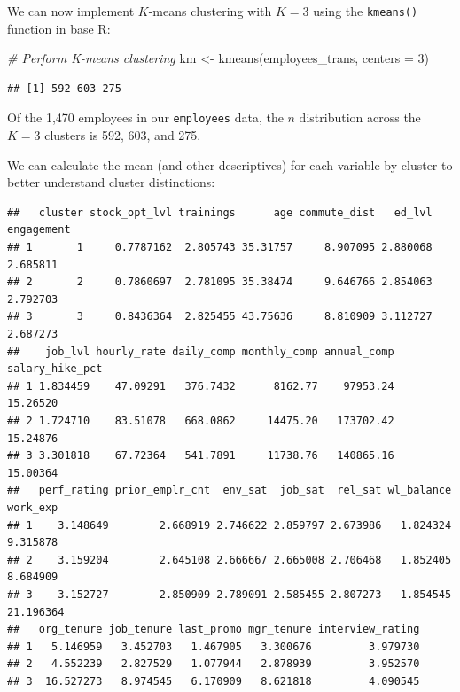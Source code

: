 \documentclass[
]{book}
\newenvironment{Shaded}{\begin{snugshade}}{\end{snugshade}}
\newcommand{\AttributeTok}[1]{\textcolor[rgb]{0.77,0.63,0.00}{#1}}
\newcommand{\CommentTok}[1]{\textcolor[rgb]{0.56,0.35,0.01}{\textit{#1}}}
\newcommand{\DecValTok}[1]{\textcolor[rgb]{0.00,0.00,0.81}{#1}}
\newcommand{\FunctionTok}[1]{\textcolor[rgb]{0.00,0.00,0.00}{#1}}
\newcommand{\NormalTok}[1]{#1}
\newcommand{\OtherTok}[1]{\textcolor[rgb]{0.56,0.35,0.01}{#1}}
\newcommand{\SpecialCharTok}[1]{\textcolor[rgb]{0.00,0.00,0.00}{#1}}
\begin{document}
We can now implement \(K\)-means clustering with \(K = 3\) using the \texttt{kmeans()} function in base R:

\begin{Shaded}
\begin{Highlighting}[]
\CommentTok{\# Perform K{-}means clustering}
\NormalTok{km }\OtherTok{\textless{}{-}} \FunctionTok{kmeans}\NormalTok{(employees\_trans, }\AttributeTok{centers =} \DecValTok{3}\NormalTok{)}
\end{Highlighting}
\end{Shaded}

\begin{Shaded}
\end{Shaded}

\begin{verbatim}
## [1] 592 603 275
\end{verbatim}

Of the 1,470 employees in our \texttt{employees} data, the \(n\) distribution across the \(K = 3\) clusters is 592, 603, and 275.

We can calculate the mean (and other descriptives) for each variable by cluster to better understand cluster distinctions:

\begin{Shaded}
\end{Shaded}

\begin{verbatim}
##   cluster stock_opt_lvl trainings      age commute_dist   ed_lvl engagement
## 1       1     0.7787162  2.805743 35.31757     8.907095 2.880068   2.685811
## 2       2     0.7860697  2.781095 35.38474     9.646766 2.854063   2.792703
## 3       3     0.8436364  2.825455 43.75636     8.810909 3.112727   2.687273
##    job_lvl hourly_rate daily_comp monthly_comp annual_comp salary_hike_pct
## 1 1.834459    47.09291   376.7432      8162.77    97953.24        15.26520
## 2 1.724710    83.51078   668.0862     14475.20   173702.42        15.24876
## 3 3.301818    67.72364   541.7891     11738.76   140865.16        15.00364
##   perf_rating prior_emplr_cnt  env_sat  job_sat  rel_sat wl_balance  work_exp
## 1    3.148649        2.668919 2.746622 2.859797 2.673986   1.824324  9.315878
## 2    3.159204        2.645108 2.666667 2.665008 2.706468   1.852405  8.684909
## 3    3.152727        2.850909 2.789091 2.585455 2.807273   1.854545 21.196364
##   org_tenure job_tenure last_promo mgr_tenure interview_rating
## 1   5.146959   3.452703   1.467905   3.300676         3.979730
## 2   4.552239   2.827529   1.077944   2.878939         3.952570
## 3  16.527273   8.974545   6.170909   8.621818         4.090545
\end{verbatim}
\end{document}
